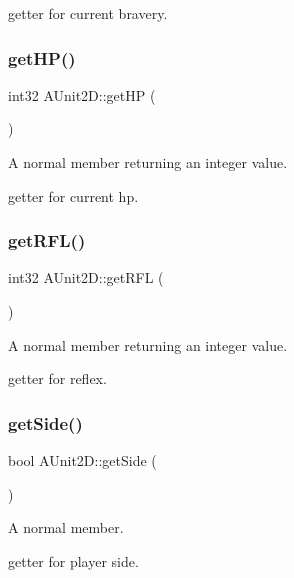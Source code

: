 getter for current bravery. \hypertarget{class_a_unit2_d_a5f1d562d11394d02ad291e7cdfaa159b}{}\label{class_a_unit2_d_a5f1d562d11394d02ad291e7cdfaa159b} 
\subsubsection{\texorpdfstring{get\+H\+P()}{getHP()}}
{\footnotesize\ttfamily int32 A\+Unit2\+D\+::get\+HP (\begin{DoxyParamCaption}{ }\end{DoxyParamCaption})}



A normal member returning an integer value. 

getter for current hp. \hypertarget{class_a_unit2_d_aa66921015cf3b796869bd23fddcc162b}{}\label{class_a_unit2_d_aa66921015cf3b796869bd23fddcc162b} 
\subsubsection{\texorpdfstring{get\+R\+F\+L()}{getRFL()}}
{\footnotesize\ttfamily int32 A\+Unit2\+D\+::get\+R\+FL (\begin{DoxyParamCaption}{ }\end{DoxyParamCaption})}



A normal member returning an integer value. 

getter for reflex. \hypertarget{class_a_unit2_d_a6426fb6d603a376b3808d558cf07c17e}{}\label{class_a_unit2_d_a6426fb6d603a376b3808d558cf07c17e} 
\subsubsection{\texorpdfstring{get\+Side()}{getSide()}}
{\footnotesize\ttfamily bool A\+Unit2\+D\+::get\+Side (\begin{DoxyParamCaption}{ }\end{DoxyParamCaption})}



A normal member. 

getter for player side. \hypertarget{class_a_unit2_d_adbe5785b68849e82ab11c48f86df64e7}{}\label{class_a_unit2_d_adbe5785b68849e82ab11c48f86df64e7} 
